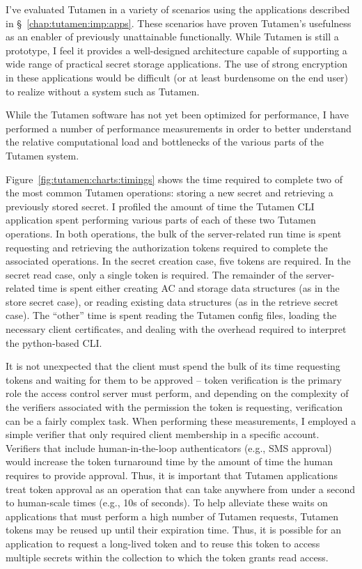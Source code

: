 I've evaluated Tutamen in a variety of scenarios using the
applications described in \S~\ref{chap:tutamen:imp:apps}. These
scenarios have proven Tutamen's usefulness as an enabler of previously
unattainable functionally. While Tutamen is still a prototype, I feel
it provides a well-designed architecture capable of supporting a wide
range of practical secret storage applications. The use of strong
encryption in these applications would be difficult (or at least
burdensome on the end user) to realize without a system such as
Tutamen.

While the Tutamen software has not yet been optimized for performance,
I have performed a number of performance measurements in order to
better understand the relative computational load and bottlenecks of
the various parts of the Tutamen system.

Figure~\ref{fig:tutamen:charts:timings} shows the time required to
complete two of the most common Tutamen operations: storing a new
secret and retrieving a previously stored secret. I profiled the
amount of time the Tutamen CLI application spent performing various
parts of each of these two Tutamen operations. In both operations, the
bulk of the server-related run time is spent requesting and retrieving
the authorization tokens required to complete the associated
operations. In the secret creation case, five tokens are required. In
the secret read case, only a single token is required. The remainder
of the server-related time is spent either creating AC and storage
data structures (as in the store secret case), or reading existing
data structures (as in the retrieve secret case). The ``other'' time
is spent reading the Tutamen config files, loading the necessary
client certificates, and dealing with the overhead required to
interpret the python-based CLI.

It is not unexpected that the client must spend the bulk of its time
requesting tokens and waiting for them to be approved -- token
verification is the primary role the access control server must
perform, and depending on the complexity of the verifiers associated
with the permission the token is requesting, verification can be a
fairly complex task. When performing these measurements, I employed a
simple verifier that only required client membership in a specific
account. Verifiers that include human-in-the-loop authenticators
(e.g., SMS approval) would increase the token turnaround time by the
amount of time the human requires to provide approval. Thus, it is
important that Tutamen applications treat token approval as an
operation that can take anywhere from under a second to human-scale
times (e.g., 10s of seconds). To help alleviate these waits on
applications that must perform a high number of Tutamen requests,
Tutamen tokens may be reused up until their expiration time. Thus, it
is possible for an application to request a long-lived token and to
reuse this token to access multiple secrets within the collection to
which the token grants read access.

